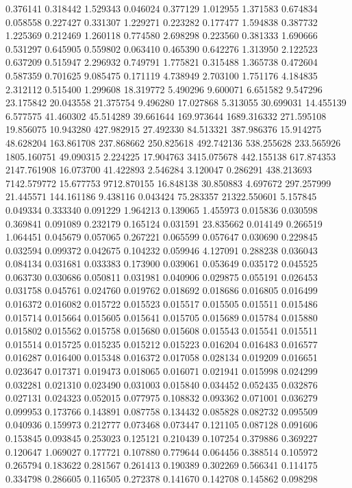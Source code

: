 0.376141
0.318442
1.529343
0.046024
0.377129
1.012955
1.371583
0.674834
0.058558
0.227427
0.331307
1.229271
0.223282
0.177477
1.594838
0.387732
1.225369
0.212469
1.260118
0.774580
2.698298
0.223560
0.381333
1.690666
0.531297
0.645905
0.559802
0.063410
0.465390
0.642276
1.313950
2.122523
0.637209
0.515947
2.296932
0.749791
1.775821
0.315488
1.365738
0.472604
0.587359
0.701625
9.085475
0.171119
4.738949
2.703100
1.751176
4.184835
2.312112
0.515400
1.299608
18.319772
5.490296
9.600071
6.651582
9.547296
23.175842
20.043558
21.375754
9.496280
17.027868
5.313055
30.699031
14.455139
6.577575
41.460302
45.514289
39.661644
169.973644
1689.316332
271.595108
19.856075
10.943280
427.982915
27.492330
84.513321
387.986376
15.914275
48.628204
163.861708
237.868662
250.825618
492.742136
538.255628
233.565926
1805.160751
49.090315
2.224225
17.904763
3415.075678
442.155138
617.874353
2147.761908
16.073700
41.422893
2.546284
3.120047
0.286291
438.213693
7142.579772
15.677753
9712.870155
16.848138
30.850883
4.697672
297.257999
21.445571
144.161186
9.438116
0.043424
75.283357
21322.550601
5.157845
0.049334
0.333340
0.091229
1.964213
0.139065
1.455973
0.015836
0.030598
0.369841
0.091089
0.232179
0.165124
0.031591
23.835662
0.014149
0.266519
1.064451
0.045679
0.057065
0.267221
0.065599
0.057647
0.030690
0.229845
0.032594
0.099372
0.042675
0.104232
0.059946
4.127091
0.288238
0.036043
0.084134
0.031681
0.033383
0.173900
0.039061
0.053649
0.035172
0.045525
0.063730
0.030686
0.050811
0.031981
0.040906
0.029875
0.055191
0.026453
0.031758
0.045761
0.024760
0.019762
0.018692
0.018686
0.016805
0.016499
0.016372
0.016082
0.015722
0.015523
0.015517
0.015505
0.015511
0.015486
0.015714
0.015664
0.015605
0.015641
0.015705
0.015689
0.015784
0.015880
0.015802
0.015562
0.015758
0.015680
0.015608
0.015543
0.015541
0.015511
0.015514
0.015725
0.015235
0.015212
0.015223
0.016204
0.016483
0.016577
0.016287
0.016400
0.015348
0.016372
0.017058
0.028134
0.019209
0.016651
0.023647
0.017371
0.019473
0.018065
0.016071
0.021941
0.015998
0.024299
0.032281
0.021310
0.023490
0.031003
0.015840
0.034452
0.052435
0.032876
0.027131
0.024323
0.052015
0.077975
0.108832
0.093362
0.071001
0.036279
0.099953
0.173766
0.143891
0.087758
0.134432
0.085828
0.082732
0.095509
0.040936
0.159973
0.212777
0.073468
0.073447
0.121105
0.087128
0.091606
0.153845
0.093845
0.253023
0.125121
0.210439
0.107254
0.379886
0.369227
0.120647
1.069027
0.177721
0.107880
0.779644
0.064456
0.388514
0.105972
0.265794
0.183622
0.281567
0.261413
0.190389
0.302269
0.566341
0.114175
0.334798
0.286605
0.116505
0.272378
0.141670
0.142708
0.145862
0.098298
